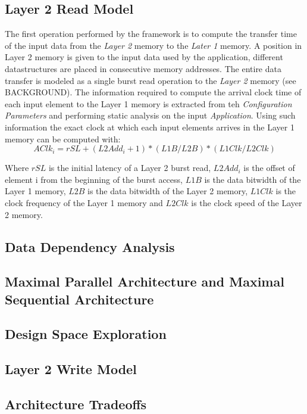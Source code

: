 \subsection{Layer 2 Read Model}
The first operation performed by the framework is to compute the transfer time of the input data from the \textit{Layer 2} memory to the \textit{Later 1} memory. A position in Layer 2 memory is given to the input data used by the application, different datastructures are placed in consecutive memory addresses. The entire data transfer is modeled as a single burst read operation to the \textit{Layer 2} memory (see BACKGROUND). The information required to compute the arrival clock time of each input element to the Layer 1 memory is extracted from teh \textit{Configuration Parameters} and performing static analysis on the input \textit{Application}.
Using such information  the exact clock at which each input elements arrives in the Layer 1 memory can be computed with:
$$
AClk_i = rSL + (L2Add_i+1) * (L1B/L2B) * (L1Clk/L2Clk)
$$

Where $rSL$ is the initial latency of a Layer 2 burst read, $L2Add_i$ is the offset of element i from the beginning of the burst access, $L1B$ is the data bitwidth of the Layer 1 memory, $L2B$ is the data bitwidth of the Layer 2 memory, $L1Clk$ is the clock frequency of the Layer 1 memory and $L2Clk$ is the clock speed of the Layer 2 memory.

\subsection{Data Dependency Analysis}
\subsection{Maximal Parallel Architecture and Maximal Sequential Architecture}
\subsection{Design Space Exploration}
\subsection{Layer 2 Write Model}
\subsection{Architecture Tradeoffs}

